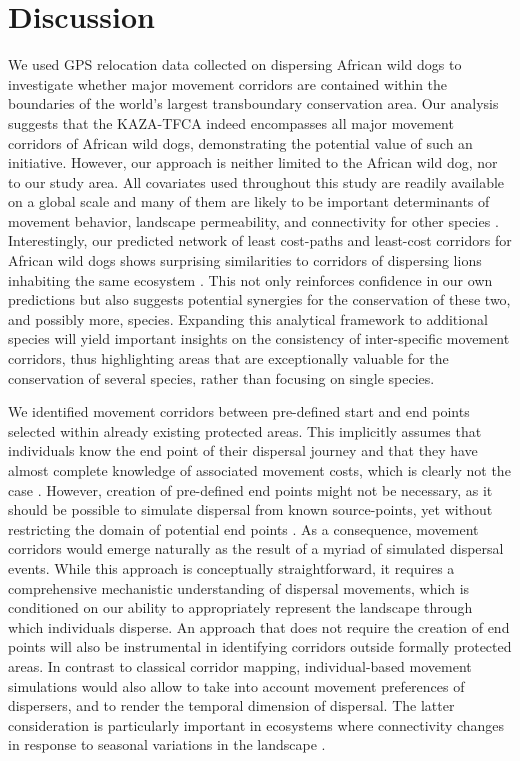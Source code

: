 \documentclass[abstract=on,10pt,a4paper,bibliography=totocnumbered]{article}
\begin{document}
\section{Discussion}
We used GPS relocation data collected on dispersing African wild dogs to
investigate whether major movement corridors are contained within the boundaries
of the world's largest transboundary conservation area. Our analysis suggests
that the KAZA-TFCA indeed encompasses all major movement corridors of African
wild dogs, demonstrating the potential value of such an initiative. However, our
approach is neither limited to the African wild dog, nor to our study area. All
covariates used throughout this study are readily available on a global scale
and many of them are likely to be important determinants of movement behavior,
landscape permeability, and connectivity for other species
\citep{Thurfjell.2014, Zeller.2012}. Interestingly, our predicted network of
least cost-paths and least-cost corridors for African wild dogs shows surprising
similarities to corridors of dispersing lions inhabiting the same ecosystem
\citep{Elliot.2014}. This not only reinforces confidence in our own predictions
but also suggests potential synergies for the conservation of these two, and
possibly more, species. Expanding this analytical framework to additional
species will yield important insights on the consistency of inter-specific
movement corridors, thus highlighting areas that are exceptionally valuable for
the conservation of several species, rather than focusing on single species.

We identified movement corridors between pre-defined start and end points
selected within already existing protected areas. This implicitly assumes that
individuals know the end point of their dispersal journey and that they have
almost complete knowledge of associated movement costs, which is clearly not the
case \citep{Abrahms.2017}. However, creation of pre-defined end points might not
be necessary, as it should be possible to simulate dispersal from known
source-points, yet without restricting the domain of potential end points
\citep{Signer.2017}. As a consequence, movement corridors would emerge naturally
as the result of a myriad of simulated dispersal events. While this approach is
conceptually straightforward, it requires a comprehensive mechanistic
understanding of dispersal movements, which is conditioned on our ability to
appropriately represent the landscape through which individuals disperse. An
approach that does not require the creation of end points will also be
instrumental in identifying corridors outside formally protected areas. In
contrast to classical corridor mapping, individual-based movement simulations
would also allow to take into account movement preferences of dispersers, and to
render the temporal dimension of dispersal. The latter consideration is
particularly important in ecosystems where connectivity changes in response to
seasonal variations in the landscape \citep{Osipova.2019}.
\end{document}
